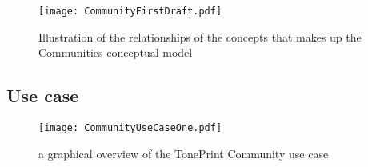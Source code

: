 \begin{figure}[H]
	\centering
	\texttt{[image: CommunityFirstDraft.pdf]}
	\caption{Illustration of the relationships of the concepts that makes up the Communities conceptual model}
	\label{fig:CommunityConceptualModel}
\end{figure}

\subsection{Use case}

\begin{figure}
	\centering
	\texttt{[image: CommunityUseCaseOne.pdf]}
	\caption{a graphical overview of the TonePrint Community use case}
	\label{fig:CommunityConceptualUseCase}
\end{figure}